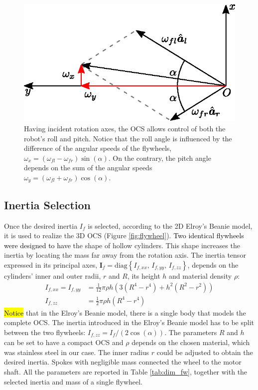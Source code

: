 \documentclass[sensors,article,accept,pdftex,moreauthors]{Definitions/mdpi}
\newcommand{\MF}[1]{\textcolor{black}{#1}}
\begin{document}
\begin{figure}[H]%
	 
	\includegraphics[width=.7\linewidth]{figures/sum_diff_mod.eps}
	\caption{Having incident rotation axes, the OCS allows control of both the robot's roll and pitch. Notice that the roll angle is influenced by the difference of the angular speeds of the flywheels, $\omega_x = \left(\omega_{fl} - \omega_{fr}\right)\sin(\alpha)$. On the contrary, the pitch angle depends on the sum of the angular speeds $\omega_y = \left(\omega_{fl} +  \omega_{fr}\right)\cos(\alpha)$.}
	\label{fig:sum-diff}
\end{figure}

\subsection{Inertia Selection}
Once the desired inertia $I_f$ is selected, according to the 2D Elroy's Beanie model, it is used to realize the 3D OCS (Figure \ref{fig:flywheel}). 
\MF{Two identical flywheels were designed to have} the shape of hollow cylinders. This shape increases the inertia by locating the mass far away from the rotation axis. The inertia tensor expressed in its principal axes, \linebreak  $\bm{I}_f = \mathrm{diag}\left\{ I_{f, xx}, \, I_{f, yy}, \, I_{f, zz}  \right\}$, depends on the cylinders' inner and outer radii, $r$ and $R$, its height $h$ and material density $\rho$:
\begin{equation}
\begin{split}
I_{f, xx} = I_{f, yy} &= \frac{1}{12}\pi \rho h \left(3\left(R^4 - r^4\right) + h^2\left(R^2 - r^2\right)\right) \\
I_{f, zz} &= \frac{1}{2}\pi \rho h \left(R^4 - r^4\right)
\end{split}
\end{equation}
\hl{Notice} that in the Elroy's Beanie model, there is a single body that models the complete OCS. The inertia introduced in the Elroy's Beanie model has to be split between the two flywheels: $I_{f, zz} = I_f/\left(2\cos(\alpha)\right)$. 
The parameters $R$ and $h$ can be set to have a compact OCS and $\rho$ depends on the chosen material, which was stainless steel in our case. The inner radius $r$ could be adjusted to obtain the desired inertia. Spokes with negligible mass connected the wheel to the motor shaft. All the parameters are reported in Table \ref{tab:dim_fw}, together with the selected inertia and mass of a single flywheel.
\end{document}
